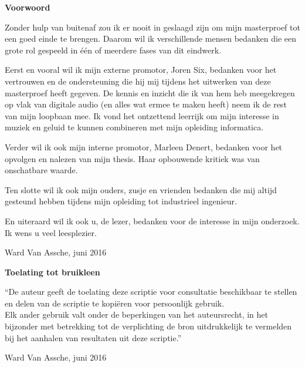 
\newpage

\noindent \textbf{\huge Voorwoord}

\vspace{1.5cm}

\noindent

Zonder hulp van buitenaf zou ik er nooit in geslaagd zijn om mijn masterproef tot een goed einde te brengen. Daarom wil ik verschillende mensen bedanken die een grote rol gespeeld in één of meerdere fases van dit eindwerk.

Eerst en vooral wil ik mijn externe promotor, Joren Six, bedanken voor het vertrouwen en de ondersteuning die hij mij tijdens het uitwerken van deze masterproef heeft gegeven. De kennis en inzicht die ik van hem heb meegekregen op vlak van digitale audio (en alles wat ermee te maken heeft) neem ik de rest van mijn loopbaan mee. Ik vond het ontzettend leerrijk om mijn interesse in muziek en geluid te kunnen combineren met mijn opleiding informatica.

Verder wil ik ook mijn interne promotor, Marleen Denert, bedanken voor het opvolgen en nalezen van mijn thesis. Haar opbouwende kritiek was van onschatbare waarde.

Ten slotte wil ik ook mijn ouders, zusje en vrienden bedanken die mij altijd gesteund hebben tijdens mijn opleiding tot industrieel ingenieur.

En uiteraard wil ik ook u, de lezer, bedanken voor de interesse in mijn onderzoek. Ik wens u veel leesplezier.

\addvspace{2.5cm}

\noindent Ward Van Assche, juni 2016\newpage

\noindent \textbf{\huge Toelating tot bruikleen}

\vspace{1.5cm}

\noindent
``De auteur geeft de toelating deze scriptie voor consultatie beschikbaar
te stellen en delen van de scriptie te kopi\"eren voor persoonlijk
gebruik.\\
Elk ander gebruik valt onder de beperkingen van het auteursrecht,
in het bijzonder met betrekking tot de verplichting de bron uitdrukkelijk
te vermelden bij het aanhalen van resultaten uit deze scriptie.''

\addvspace{4cm}

\noindent Ward Van Assche, juni 2016
